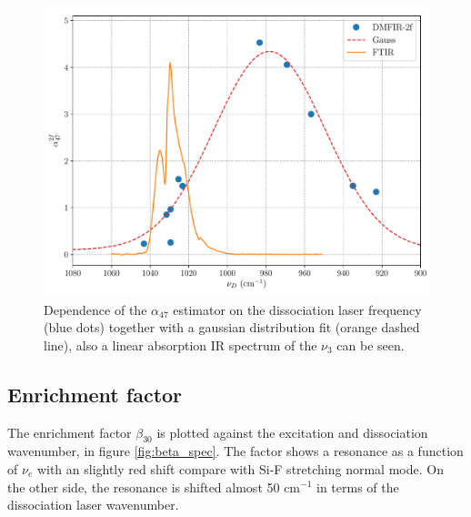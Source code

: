 \documentclass[global,twocolumn]{svjour}
\begin{document}
\begin{figure}[h]
	\centering
	\includegraphics[width = 1\linewidth]{figures/alfa_47_nu_diso.pdf}
	\caption{\label{fig:alfa_nu_diso} Dependence of the $\alpha_{47}$ estimator on the dissociation laser frequency (blue dots) together with a gaussian distribution fit (orange dashed line), also a linear absorption IR spectrum of the $\nu_{3}$ can be seen.}
\end{figure}

\subsection{Enrichment factor}
The enrichment factor $\beta_{30}$ is plotted against the excitation and dissociation wavenumber, in figure \ref{fig:beta_spec}. The factor shows a resonance as a function of $\nu_{e}$ with an slightly red shift compare with Si-F stretching normal mode. On the other side, the resonance is shifted almost 50 cm$^{-1}$ in terms of the dissociation laser wavenumber. 
\end{document}
